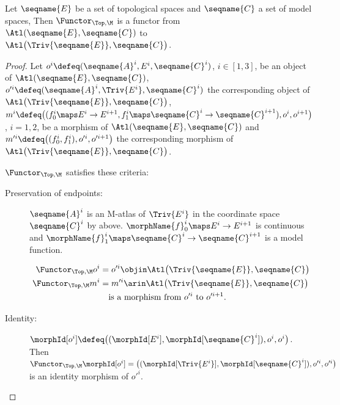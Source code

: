 \documentclass{article}
\begin{document}
\begin{theorem}
\label{the:Func-Top-M}
Let $\seqname{E}$ be a set of topological spaces and $\seqname{C}$ a set
of model spaces, Then $\Functor_{\Top,\M}$ is a functor from
$\Atl(\seqname{E}, \seqname{C})$ to
$\Atl \big ( \Triv{\seqname{E}}, \seqname{C} \big )$.

\begin{proof}
Let $o^i \defeq (\seqname{A}^i, E^i, \seqname{C}^i)$, $i \in [1,3]$,
be an object of $\Atl(\seqname{E}, \seqname{C})$,
$o'^i \defeq (\seqname{A}^i, \Triv{E^i}, \seqname{C}^i)$
the corresponding object of
$\Atl \big ( \Triv{\seqname{E}}, \seqname{C} \big )$,
$
 m^i \defeq
  \bigl (
    (f_0^i \maps  E^i \to E^{i+1}, f_1^i \maps  \seqname{C}^i \to  \seqname{C}^{i+1}),
   o^i ,
   o^{i+1}
 \bigr )
$,
$i=1,2$, be a morphism of $\Atl(\seqname{E}, \seqname{C})$ and
$
  m'^i \defeq
  \bigl (
    (f_0^i, f_1^i),
    o'^i ,
   o'^{i+1}
  \bigr )
$
the corresponding morphism of
$\Atl \big ( \Triv{\seqname{E}}, \seqname{C} \big )$.

$\Functor_{\Top,\M}$ satisfies these criteria:
\begin{description}
\item[Preservation of endpoints:]
$\seqname{A}^i$ is an M-atlas of $\Triv{E^i}$ in the coordinate space
$\seqname{C}^i$ by  above.
$\morphName{f}_0^i \maps E^i \to E^{i+1}$ is continuous and
$\morphName{f}_1^i \maps \seqname{C}^i \to \seqname{C}^{i+1}$ is a model
function.

\begin{align*}
  \Functor_{\Top,\M} o^i
  & =
  o'^i \objin \Atl \big ( \Triv{\seqname{E}}, \seqname{C} \big )
\\*
  \Functor_{\Top,\M} m^i
  & =
  m'^i \arin \Atl \big ( \Triv{\seqname{E}}, \seqname{C} \big )
\\*
  & \quad
\text{is a morphism from $o'^i$ to $o'^{i+1}$.}
\end{align*}

\item[Identity:]
$
  \morphId[o^i] \defeq
  \bigl (
    (\morphId[E^i], \morphId[\seqname{C}^i]),
    o^i,
    o^i
  \bigr )
$.
Then
$
  \Functor_{\Top,\M} \morphId[o^i] =
  \bigl (
    (\morphId[{\Triv{E^i}}], \morphId[{\seqname{C}^i}]),
    o'^i,
    o'^i
  \bigr )
$
is an identity morphism of
$o'^i$.


\end{description}
\end{proof}
\end{theorem}
\end{document}
